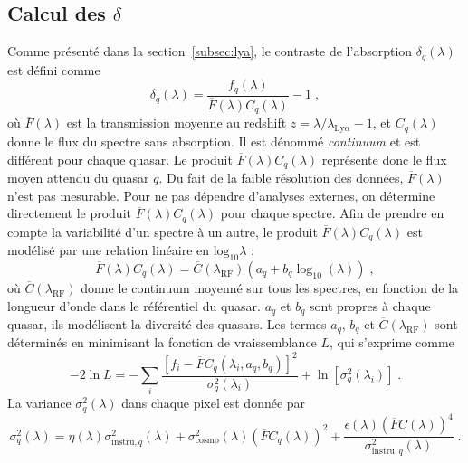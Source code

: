 \documentclass[11pt, twoside, a4paper, openright]{report}
\begin{document}
\subsection{Calcul des $\delta$}
Comme présenté dans la section~\ref{subsec:lya}, le contraste de l'absorption \lya{} $\delta_q(\lambda)$ est défini comme
\begin{equation}
  \label{eq:deltaF}
  \delta_q(\lambda) = \frac{f_q(\lambda)}{\overline F(\lambda) C_q(\lambda)} - 1 \;,
\end{equation}
où $\overline F(\lambda)$ est la transmission moyenne au redshift $z = \lambda / \lambda_{\mathrm{Ly}\alpha} - 1$, et $C_q(\lambda)$ donne le flux du spectre sans absorption. Il est dénommé \emph{continuum} et est différent pour chaque quasar.
Le produit $\overline F(\lambda) C_q(\lambda)$ représente donc le flux moyen attendu du quasar $q$.
Du fait de la faible résolution des données, $\overline F(\lambda)$ n'est pas mesurable. Pour ne pas dépendre d'analyses externes, on détermine directement le produit $\overline F(\lambda) C_q(\lambda)$ pour chaque spectre.
Afin de prendre en compte la variabilité d'un spectre à un autre, le produit $\overline F(\lambda) C_q(\lambda)$ est modélisé par une relation linéaire en $\mathrm{log}_{10} \lambda$ :
\begin{equation}
  \label{eq:diversity}
  \overline F(\lambda) C_q(\lambda) = \overline C(\lambda_{\mathrm{RF}})(a_q + b_q \log_{10}(\lambda)) \; ,
\end{equation}
où $\overline C(\lambda_{\mathrm{RF}})$ donne le continuum moyenné sur tous les spectres, en fonction de la longueur d'onde dans le référentiel du quasar. $a_q$ et $b_q$ sont propres à chaque quasar, ils modélisent la diversité des quasars.
Les termes $a_q$, $b_q$ et $\overline C(\lambda_{\mathrm{RF}})$ sont déterminés en minimisant la fonction de vraissemblance $L$, qui s'exprime comme
\begin{equation}
  \label{eq:likelihood}
  - 2 \ln L = - \sum\limits_{i} \frac{\left[f_{i} - \overline F C_q(\lambda_{i}, a_q, b_q)\right]^2}{\sigma_q^2 (\lambda_i)} + \ln [\sigma_q^2 (\lambda_i)] \;  .
\end{equation}
La variance $\sigma_q^2(\lambda)$ dans chaque pixel est donnée par
\begin{equation}
  \label{eq:variance}
  \sigma_q^2(\lambda) = \eta(\lambda) \sigma_{\mathrm{instru}, q}^2(\lambda) + \sigma_{\mathrm{cosmo}}^2 (\lambda) (\overline F C_q(\lambda))^2 + \frac{\epsilon(\lambda)(\overline F C(\lambda))^4}{\sigma_{\mathrm{instru},q}^2 (\lambda)}  \; .
\end{equation}
\end{document}
